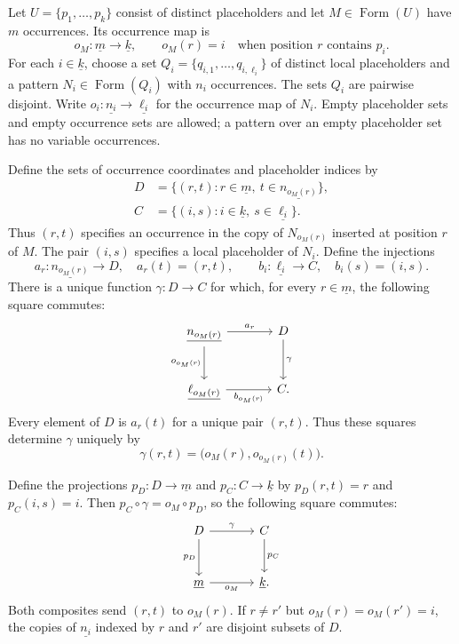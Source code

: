 \documentclass[11pt]{article}
\newcommand{\FormulaSet}{\operatorname{Form}}
\begin{document}
Let $U=\{p_1,\ldots,p_k\}$ consist of distinct placeholders and let
$M\in\FormulaSet(U)$ have $m$ occurrences. Its occurrence map is
\[
 o_M:\underline m\longrightarrow\underline k,
 \qquad o_M(r)=i\quad\text{when position $r$ contains $p_i$}.
\]
For each $i\in\underline k$, choose a set
$Q_i=\{q_{i,1},\ldots,q_{i,\ell_i}\}$ of distinct local placeholders and a
pattern $N_i\in\FormulaSet(Q_i)$ with $n_i$ occurrences. The sets
$Q_i$ are pairwise disjoint. Write
$o_i:\underline{n_i}\to\underline{\ell_i}$ for the occurrence map of $N_i$.
Empty placeholder sets and empty occurrence sets are allowed; a
pattern over an empty placeholder set has no variable occurrences.

Define the sets of occurrence coordinates and placeholder indices by
\[
 \begin{aligned}
 D&=\{(r,t):r\in\underline m,\ t\in\underline{n_{o_M(r)}}\},\\
 C&=\{(i,s):i\in\underline k,\ s\in\underline{\ell_i}\}.
 \end{aligned}
\]
Thus $(r,t)$ specifies an occurrence in the copy of $N_{o_M(r)}$
inserted at position $r$ of $M$. The pair $(i,s)$ specifies a local
placeholder of $N_i$. Define the injections
\[
 a_r:\underline{n_{o_M(r)}}\longrightarrow D,\quad a_r(t)=(r,t),
 \qquad
 b_i:\underline{\ell_i}\longrightarrow C,\quad b_i(s)=(i,s).
\]
There is a unique function $\gamma:D\to C$ for which, for every
$r\in\underline m$, the following square commutes:
\begin{equation}\label{eq:app-fibre}
\begin{tikzcd}[column sep=large,row sep=large]
 \underline{n_{o_M(r)}}\arrow[r,"a_r"]\arrow[d,"o_{o_M(r)}"']
   &D\arrow[d,"\gamma"]\\
 \underline{\ell_{o_M(r)}}\arrow[r,"b_{o_M(r)}"']&C.
\end{tikzcd}
\end{equation}
Every element of $D$ is $a_r(t)$ for a unique pair $(r,t)$.
Thus these squares determine $\gamma$ uniquely by
\[
 \gamma(r,t)=\bigl(o_M(r),o_{o_M(r)}(t)\bigr).
\]

Define the projections $p_D:D\to\underline m$ and
$p_C:C\to\underline k$ by $p_D(r,t)=r$ and $p_C(i,s)=i$.
Then $p_C\circ\gamma=o_M\circ p_D$, so the following square commutes:
\begin{equation}\label{eq:app-profile}
\begin{tikzcd}[column sep=large,row sep=large]
 D\arrow[r,"\gamma"]\arrow[d,"p_D"']&C\arrow[d,"p_C"]\\
 \underline m\arrow[r,"o_M"']&\underline k.
\end{tikzcd}
\end{equation}
Both composites send $(r,t)$ to $o_M(r)$.
If $r\ne r'$ but $o_M(r)=o_M(r')=i$, the copies of
$\underline{n_i}$ indexed by $r$ and $r'$ are disjoint subsets
of $D$.
\end{document}

